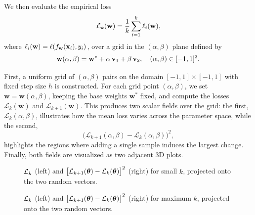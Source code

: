 \documentclass{article}
\begin{document}
We then evaluate the empirical loss
$$
  \mathcal{L}_k(\mathbf{w}) =
  \frac1k \sum_{i=1}^k \ell_i(\mathbf{w}),
$$
where $\ell_i(\mathbf{w}) = \ell (f_{\mathbf{w}}(\mathbf{x}_i), y_i)$, over a grid in the $(\alpha, \beta)$ plane defined by
$$
  \mathbf{w}(\alpha,\beta) =
  \mathbf{w}^* + \alpha\, \mathbf v_1 + \beta\, \mathbf v_2, \quad
  (\alpha, \beta) \in [-1,1]^2.
$$

First, a uniform grid of $(\alpha,\beta)$ pairs on the domain $[-1,1]\times[-1,1]$ with fixed step size $h$ is constructed.
For each grid point $(\alpha,\beta)$, we set $\mathbf{w} = \mathbf{w}(\alpha,\beta)$, keeping the base weights
$\mathbf{w}^*$ fixed, and compute the losses $\mathcal{L}_k(\mathbf{w})$ and $\mathcal{L}_{k+1}(\mathbf{w})$.
This produces two scalar fields over the grid: the first, $\mathcal{L}_k(\alpha,\beta)$, illustrates how the mean loss
varies across the parameter space, while the second,
$$\bigl(\mathcal{L}_{k+1}(\alpha,\beta) - \mathcal{L}_k(\alpha,\beta)\bigr)^2,$$ highlights the regions where adding a single
sample induces the largest change. Finally, both fields are visualized as two adjacent 3D plots.

\begin{figure}[!htbp]
  \hspace*{-2.2cm}
  \caption{$\mathcal{L}_k$ (left) and $\bigl[ \mathcal{L}_{k+1}(\boldsymbol{\theta}) - \mathcal{L}_k(\boldsymbol{\theta}) \bigr]^2$ (right) for small $k$, projected onto the two random vectors.}
  \label{fig:loss_random_small}
\end{figure}

\begin{figure}[!htbp]
  \hspace*{-2.2cm}
  \caption{$\mathcal{L}_k$ (left) and $\bigl[ \mathcal{L}_{k+1}(\boldsymbol{\theta}) - \mathcal{L}_k(\boldsymbol{\theta}) \bigr]^2$ (right) for maximum $k$, projected onto the two random vectors.}
  \label{fig:loss_random_big}
\end{figure}
\end{document}
